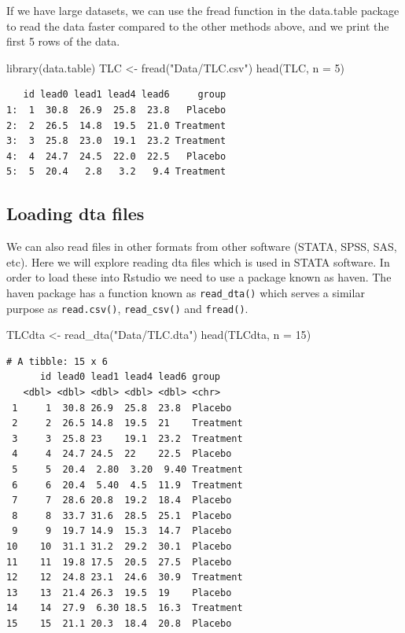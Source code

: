 \documentclass[
  letterpaper,
  DIV=11,
  numbers=noendperiod]{scrreprt}
\newenvironment{Shaded}{\begin{snugshade}}{\end{snugshade}}
\newcommand{\AttributeTok}[1]{\textcolor[rgb]{0.40,0.45,0.13}{#1}}
\newcommand{\DecValTok}[1]{\textcolor[rgb]{0.68,0.00,0.00}{#1}}
\newcommand{\FunctionTok}[1]{\textcolor[rgb]{0.28,0.35,0.67}{#1}}
\newcommand{\NormalTok}[1]{\textcolor[rgb]{0.00,0.23,0.31}{#1}}
\newcommand{\OtherTok}[1]{\textcolor[rgb]{0.00,0.23,0.31}{#1}}
\newcommand{\StringTok}[1]{\textcolor[rgb]{0.13,0.47,0.30}{#1}}
\begin{document}
If we have large datasets, we can use the fread function in the
data.table package to read the data faster compared to the other methods
above, and we print the first 5 rows of the data.

\begin{Shaded}
\begin{Highlighting}[]
\FunctionTok{library}\NormalTok{(data.table)}
\NormalTok{TLC }\OtherTok{\textless{}{-}} \FunctionTok{fread}\NormalTok{(}\StringTok{"Data/TLC.csv"}\NormalTok{)}
\FunctionTok{head}\NormalTok{(TLC, }\AttributeTok{n =} \DecValTok{5}\NormalTok{)}
\end{Highlighting}
\end{Shaded}

\begin{verbatim}
   id lead0 lead1 lead4 lead6     group
1:  1  30.8  26.9  25.8  23.8   Placebo
2:  2  26.5  14.8  19.5  21.0 Treatment
3:  3  25.8  23.0  19.1  23.2 Treatment
4:  4  24.7  24.5  22.0  22.5   Placebo
5:  5  20.4   2.8   3.2   9.4 Treatment
\end{verbatim}

\hypertarget{loading-dta-files}{%
\subsection*{Loading dta files}\label{loading-dta-files}}

We can also read files in other formats from other software (STATA,
SPSS, SAS, etc). Here we will explore reading dta files which is used in
STATA software. In order to load these into Rstudio we need to use a
package known as haven. The haven package has a function known as
\texttt{read\_dta()} which serves a similar purpose as
\texttt{read.csv()}, \texttt{read\_csv()} and \texttt{fread()}.

\begin{Shaded}
\begin{Highlighting}[]
\NormalTok{TLCdta }\OtherTok{\textless{}{-}} \FunctionTok{read\_dta}\NormalTok{(}\StringTok{"Data/TLC.dta"}\NormalTok{)}
\FunctionTok{head}\NormalTok{(TLCdta, }\AttributeTok{n =} \DecValTok{15}\NormalTok{)}
\end{Highlighting}
\end{Shaded}

\begin{verbatim}
# A tibble: 15 x 6
      id lead0 lead1 lead4 lead6 group    
   <dbl> <dbl> <dbl> <dbl> <dbl> <chr>    
 1     1  30.8 26.9  25.8  23.8  Placebo  
 2     2  26.5 14.8  19.5  21    Treatment
 3     3  25.8 23    19.1  23.2  Treatment
 4     4  24.7 24.5  22    22.5  Placebo  
 5     5  20.4  2.80  3.20  9.40 Treatment
 6     6  20.4  5.40  4.5  11.9  Treatment
 7     7  28.6 20.8  19.2  18.4  Placebo  
 8     8  33.7 31.6  28.5  25.1  Placebo  
 9     9  19.7 14.9  15.3  14.7  Placebo  
10    10  31.1 31.2  29.2  30.1  Placebo  
11    11  19.8 17.5  20.5  27.5  Placebo  
12    12  24.8 23.1  24.6  30.9  Treatment
13    13  21.4 26.3  19.5  19    Placebo  
14    14  27.9  6.30 18.5  16.3  Treatment
15    15  21.1 20.3  18.4  20.8  Placebo  
\end{verbatim}
\end{document}
